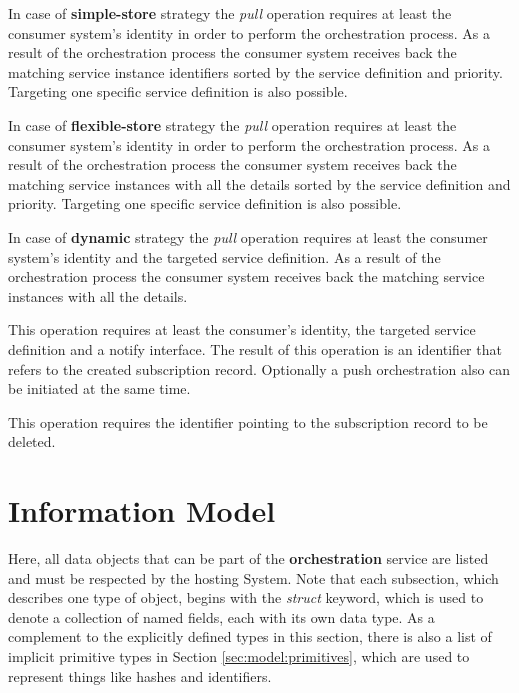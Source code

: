 \documentclass[a4paper]{arrowhead}
\begin{document}
In case of \textbf{simple-store} strategy the \textit{pull} operation requires at least the consumer system's identity in order to perform the orchestration process. As a result of the orchestration process the consumer system receives back the matching service instance identifiers sorted by the service definition and priority. Targeting one specific service definition is also possible.

In case of \textbf{flexible-store} strategy the \textit{pull} operation requires at least the consumer system's identity in order to perform the orchestration process. As a result of the orchestration process the consumer system receives back the matching service instances with all the details sorted by the service definition and priority. Targeting one specific service definition is also possible.

In case of \textbf{dynamic} strategy the \textit{pull} operation requires at least the consumer system's identity and the targeted service definition. As a result of the orchestration process the consumer system receives back the matching service instances with all the details.


This operation requires at least the consumer's identity, the targeted service definition and a notify interface. The result of this operation is an identifier that refers to the created subscription record. Optionally a push orchestration also can be initiated at the same time.


This operation requires the identifier pointing to the subscription record to be deleted.


\clearpage

\section{Information Model}
\label{sec:model}

Here, all data objects that can be part of the \textbf{orchestration} service are listed and must be respected by the hosting System.
Note that each subsection, which describes one type of object, begins with the \textit{struct} keyword, which is used to denote a collection of named fields, each with its own data type.
As a complement to the explicitly defined types in this section, there is also a list of implicit primitive types in Section \ref{sec:model:primitives}, which are used to represent things like hashes and identifiers.
\end{document}
